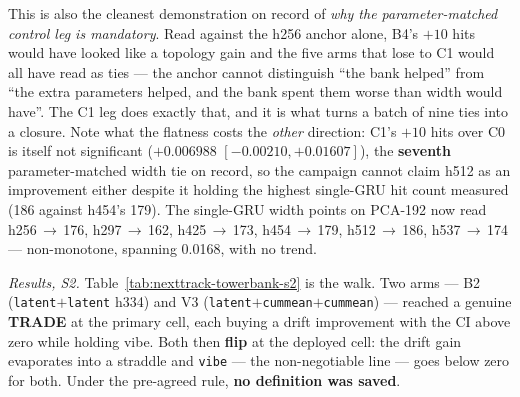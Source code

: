\documentclass[11pt]{article}
\begin{document}
This is also the cleanest demonstration on record of \emph{why the
parameter-matched control leg is mandatory}. Read against the h256 anchor alone,
B4's $+\num{10}$ hits would have looked like a topology gain and the five arms
that lose to C1 would all have read as ties --- the anchor cannot distinguish
``the bank helped'' from ``the extra parameters helped, and the bank spent them
worse than width would have''. The C1 leg does exactly that, and it is what turns
a batch of nine ties into a closure. Note what the flatness costs the \emph{other}
direction: C1's $+\num{10}$ hits over C0 is itself not significant
($+\num{0.006988}$ $[-\num{0.00210},+\num{0.01607}]$), the \textbf{seventh}
parameter-matched width tie on record, so the campaign cannot claim h512 as an
improvement either despite it holding the highest single-GRU hit count measured
(\num{186} against h454's \num{179}). The single-GRU width points on PCA-192 now
read h256\,$\to$\,\num{176}, h297\,$\to$\,\num{162}, h425\,$\to$\,\num{173},
h454\,$\to$\,\num{179}, h512\,$\to$\,\num{186}, h537\,$\to$\,\num{174} ---
non-monotone, spanning \num{0.0168}, with no trend.

\emph{Results, S2.} Table~\ref{tab:nexttrack-towerbank-s2} is the walk. Two arms
--- B2 (\texttt{latent}$+$\texttt{latent} h334) and V3
(\texttt{latent}$+$\texttt{cummean}$+$\texttt{cummean}) --- reached a genuine
\textbf{TRADE} at the primary cell, each buying a drift improvement with the CI
above zero while holding vibe. Both then \textbf{flip} at the deployed cell: the
drift gain evaporates into a straddle and \texttt{vibe} --- the non-negotiable
line --- goes below zero for both. Under the pre-agreed rule, \textbf{no
definition was saved}.
\end{document}
